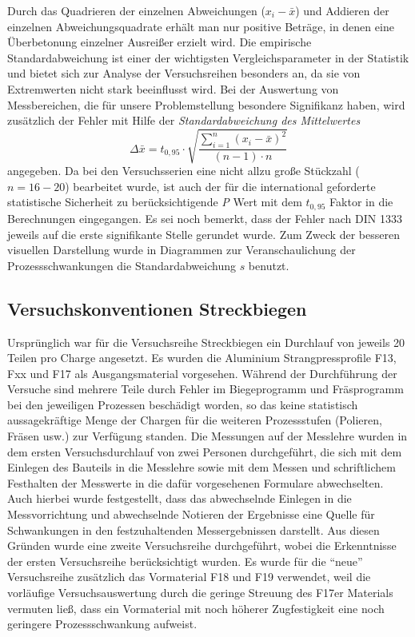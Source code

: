 \documentclass[12pt,a4paper,parskip,twoside,BCOR5mm,headsepline]{scrartcl}
\begin{document}
Durch das Quadrieren der einzelnen Abweichungen ($ x_i-\bar{x}$) und Addieren der einzelnen Abweichungsquadrate erhält man nur positive Beträge, in denen eine Überbetonung einzelner Ausreißer erzielt wird.
Die empirische Standardabweichung ist   einer der wichtigsten Vergleichsparameter in der Statistik und bietet sich zur Analyse der Versuchsreihen besonders an, da sie von Extremwerten nicht stark beeinflusst wird. \autocite[54]{gst}  Bei der Auswertung von Messbereichen, die für unsere Problemstellung besondere Signifikanz haben, wird zusätzlich der Fehler mit Hilfe der  \emph{Standardabweichung des Mittelwertes }  \begin{equation} \Delta\bar{x}= t_{0,95} \cdot \sqrt{\frac{\sum \limits_{i=1}^n (x_i - \bar{x})^2}{(n-1)\cdot n}}\end{equation}  angegeben. 
\autocite[16]{ph} Da bei den Versuchsserien eine nicht allzu große Stückzahl ($ n=16-20 $) bearbeitet wurde,  ist auch der für die international geforderte statistische Sicherheit zu berücksichtigende \emph{P} Wert mit dem $ t_{0,95} $ Faktor in die Berechnungen eingegangen. 
 \autocite[609]{tp}  Es sei noch bemerkt, dass der Fehler nach DIN 1333 jeweils auf die erste signifikante Stelle gerundet wurde. \autocite[612]{tp}
Zum Zweck der besseren visuellen Darstellung wurde in Diagrammen zur Veranschaulichung der Prozessschwankungen die Standardabweichung $s$ benutzt.
 	 	
 	

 	
\subsection{Versuchskonventionen Streckbiegen}
Ursprünglich war für die Versuchsreihe Streckbiegen ein Durchlauf von jeweils 20 Teilen pro Charge angesetzt. Es wurden die Aluminium Strangpressprofile F13, Fxx und F17 als Ausgangsmaterial vorgesehen. Während der Durchführung der Versuche sind mehrere Teile durch Fehler im Biegeprogramm und Fräsprogramm bei den jeweiligen Prozessen beschädigt worden, so das keine statistisch aussagekräftige Menge  der Chargen für die weiteren Prozessstufen (Polieren, Fräsen usw.) zur Verfügung standen. Die Messungen auf der Messlehre wurden in dem ersten Versuchsdurchlauf von zwei Personen durchgeführt, die sich mit dem Einlegen des Bauteils in die Messlehre sowie mit dem Messen und schriftlichem Festhalten der Messwerte in die dafür vorgesehenen Formulare abwechselten. Auch hierbei wurde festgestellt, dass das abwechselnde Einlegen in die Messvorrichtung und abwechselnde Notieren der Ergebnisse eine Quelle für Schwankungen in den festzuhaltenden Messergebnissen darstellt. Aus diesen Gründen wurde eine zweite Versuchsreihe durchgeführt, wobei die Erkenntnisse der ersten Versuchsreihe berücksichtigt wurden. Es wurde für die "`neue"' Versuchsreihe zusätzlich das Vormaterial F18 und F19 verwendet,  weil die vorläufige Versuchsauswertung durch die geringe Streuung des F17er Materials vermuten ließ, dass ein Vormaterial mit noch höherer Zugfestigkeit eine noch geringere Prozessschwankung aufweist.
\end{document}
